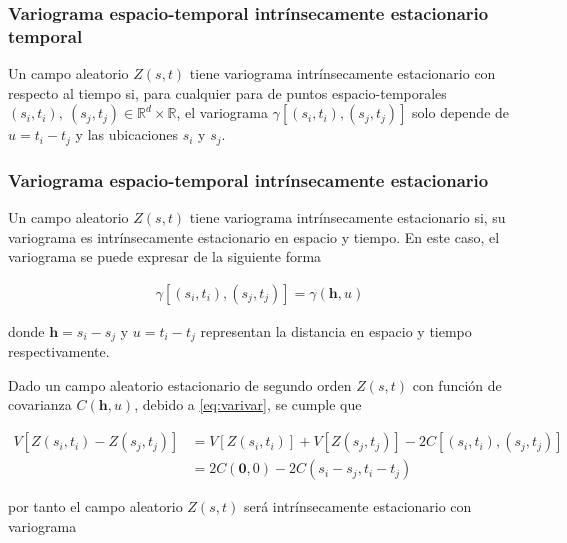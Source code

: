 \documentclass[
]{book}
\begin{document}
\hypertarget{variograma-espacio-temporal-intruxednsecamente-estacionario-temporal}{%
\subsubsection*{Variograma espacio-temporal intrínsecamente estacionario temporal}\label{variograma-espacio-temporal-intruxednsecamente-estacionario-temporal}}

Un campo aleatorio \(Z(s,t)\) tiene variograma intrínsecamente estacionario con respecto al tiempo si, para cualquier para de puntos espacio-temporales \((s_i,t_i), \ (s_j,t_j) \in \mathbb{R}^d \times \mathbb{R}\), el variograma \(\gamma[(s_i,t_i),(s_j,t_j)]\) solo depende de \(u=t_i-t_j\) y las ubicaciones \(s_i\) y \(s_j\).

\hypertarget{variograma-espacio-temporal-intruxednsecamente-estacionario}{%
\subsubsection*{Variograma espacio-temporal intrínsecamente estacionario}\label{variograma-espacio-temporal-intruxednsecamente-estacionario}}

Un campo aleatorio \(Z(s,t)\) tiene variograma intrínsecamente estacionario si, su variograma es intrínsecamente estacionario en espacio y tiempo. En este caso, el variograma se puede expresar de la siguiente forma

\begin{align}
\gamma[(s_i,t_i),(s_j,t_j)]=\gamma(\textbf{h},u)
\end{align}

donde \(\textbf{h}=s_i-s_j\) y \(u=t_i-t_j\) representan la distancia en espacio y tiempo respectivamente.

Dado un campo aleatorio estacionario de segundo orden \(Z(s,t)\) con función de covarianza \(C(\textbf{h},u)\), debido a \eqref{eq:varivar}, se cumple que

\begin{align}
V[Z(s_i,t_i)-Z(s_j,t_j)]&=V[Z(s_i,t_i)]+V[Z(s_j,t_j)]-2C[(s_i,t_i),(s_j,t_j)]\\
&=2C(\textbf{0},0)-2C(s_i-s_j,t_i-t_j)
\end{align}

por tanto el campo aleatorio \(Z(s,t)\) será intrínsecamente estacionario con variograma
\end{document}
